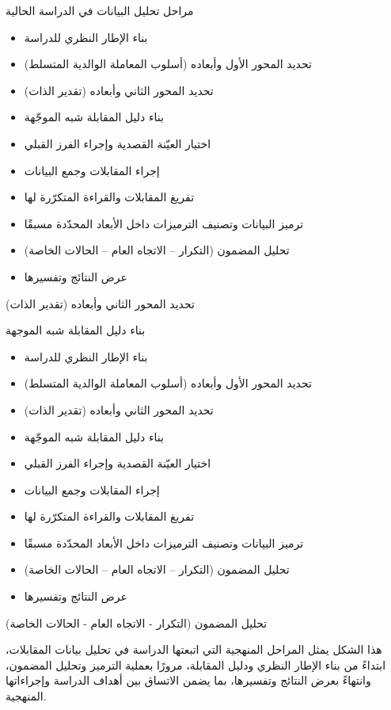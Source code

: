 \documentclass[12pt,oneside]{report}
\begin{document}
مراحل تحليل البيانات في الدراسة الحالية

\begin{itemize}[leftmargin=1.6em,itemsep=1pt]
\item بناء الإطار النظري للدراسة
\item تحديد المحور الأول وأبعاده (أسلوب المعاملة الوالدية المتسلط)
\item تحديد المحور الثاني وأبعاده (تقدير الذات)
\item بناء دليل المقابلة شبه الموجّهة
\item اختيار العيّنة القصدية وإجراء الفرز القبلي
\item إجراء المقابلات وجمع البيانات
\item تفريغ المقابلات والقراءة المتكرّرة لها
\item ترميز البيانات وتصنيف الترميزات داخل الأبعاد المحدّدة مسبقًا
\item تحليل المضمون (التكرار -- الاتجاه العام -- الحالات الخاصة)
\item عرض النتائج وتفسيرها
\end{itemize}
تحديد المحور الثاني وأبعاده (تقدير الذات)

بناء دليل المقابلة شبه الموجهة

\begin{itemize}[leftmargin=1.6em,itemsep=1pt]
\item بناء الإطار النظري للدراسة
\item تحديد المحور الأول وأبعاده (أسلوب المعاملة الوالدية المتسلط)
\item تحديد المحور الثاني وأبعاده (تقدير الذات)
\item بناء دليل المقابلة شبه الموجّهة
\item اختيار العيّنة القصدية وإجراء الفرز القبلي
\item إجراء المقابلات وجمع البيانات
\item تفريغ المقابلات والقراءة المتكرّرة لها
\item ترميز البيانات وتصنيف الترميزات داخل الأبعاد المحدّدة مسبقًا
\item تحليل المضمون (التكرار -- الاتجاه العام -- الحالات الخاصة)
\item عرض النتائج وتفسيرها
\end{itemize}
تحليل المضمون (التكرار - الاتجاه العام - الحالات الخاصة)

هذا الشكل يمثل المراحل المنهجية التي اتبعتها الدراسة في تحليل بيانات المقابلات، ابتداءً من بناء الإطار النظري ودليل المقابلة، مرورًا بعملية الترميز وتحليل المضمون، وانتهاءً بعرض النتائج وتفسيرها، بما يضمن الاتساق بين أهداف الدراسة وإجراءاتها المنهجية.
\end{document}
